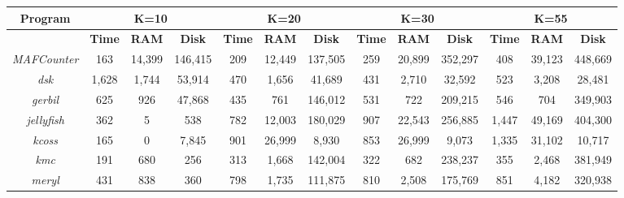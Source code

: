 \documentclass{article}
\begin{document}
\noindent
\setlength{\tabcolsep}{1pt}
\scriptsize
\begin{adjustbox}{max width=\textwidth, max totalheight=\textheight, keepaspectratio}
\begin{tabular}{@{}|c|c|c|c|c|c|c|c|c|c|c|c|c|}
\hline
\textbf{Program} & \multicolumn{3}{c|}{\textbf{K=10}} & \multicolumn{3}{c|}{\textbf{K=20}} & \multicolumn{3}{c|}{\textbf{K=30}} & \multicolumn{3}{c|}{\textbf{K=55}} \\
\hline
 & \textbf{\hspace{2pt}Time\hspace{2pt}} & \textbf{\hspace{2pt}RAM\hspace{2pt}} & \textbf{\hspace{2pt}Disk\hspace{2pt}} & \textbf{\hspace{2pt}Time\hspace{2pt}} & \textbf{\hspace{2pt}RAM\hspace{2pt}} & \textbf{\hspace{2pt}Disk\hspace{2pt}} & \textbf{\hspace{2pt}Time\hspace{2pt}} & \textbf{\hspace{2pt}RAM\hspace{2pt}} & \textbf{\hspace{2pt}Disk\hspace{2pt}} & \textbf{\hspace{2pt}Time\hspace{2pt}} & \textbf{\hspace{2pt}RAM\hspace{2pt}} & \textbf{\hspace{2pt}Disk\hspace{2pt}} \\
\hline
\textit{MAFCounter} & 163 & 14,399 & 146,415 & 209 & 12,449 & 137,505 & 259 & 20,899 & 352,297 & 408 & 39,123 & 448,669 \\
\hline
\textit{dsk} & 1,628 & 1,744 & 53,914 & 470 & 1,656 & 41,689 & 431 & 2,710 & 32,592 & 523 & 3,208 & 28,481 \\
\hline
\textit{gerbil} & 625 & 926 & 47,868 & 435 & 761 & 146,012 & 531 & 722 & 209,215 & 546 & 704 & 349,903 \\
\hline
\textit{jellyfish} & 362 & 5 & 538 & 782 & 12,003 & 180,029 & 907 & 22,543 & 256,885 & 1,447 & 49,169 & 404,300 \\
\hline
\textit{kcoss} & 165 & 0 & 7,845 & 901 & 26,999 & 8,930 & 853 & 26,999 & 9,073 & 1,335 & 31,102 & 10,717 \\
\hline
\textit{kmc} & 191 & 680 & 256 & 313 & 1,668 & 142,004 & 322 & 682 & 238,237 & 355 & 2,468 & 381,949 \\
\hline
\textit{meryl} & 431 & 838 & 360 & 798 & 1,735 & 111,875 & 810 & 2,508 & 175,769 & 851 & 4,182 & 320,938 \\
\hline
\end{tabular}
\end{adjustbox}
\end{document}
